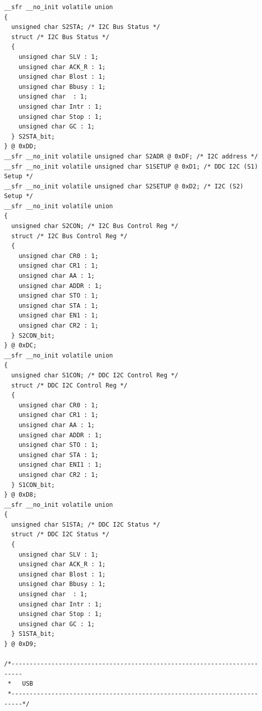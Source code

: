 \documentclass[10pt,a4paper,final]{article}
\begin{document}
\begin{lstlisting}[label={list:first},caption=Code source]
__sfr __no_init volatile union
{
  unsigned char S2STA; /* I2C Bus Status */
  struct /* I2C Bus Status */
  {
    unsigned char SLV : 1;
    unsigned char ACK_R : 1;
    unsigned char Blost : 1;
    unsigned char Bbusy : 1;
    unsigned char  : 1;
    unsigned char Intr : 1;
    unsigned char Stop : 1;
    unsigned char GC : 1;
  } S2STA_bit;
} @ 0xDD;
__sfr __no_init volatile unsigned char S2ADR @ 0xDF; /* I2C address */
__sfr __no_init volatile unsigned char S1SETUP @ 0xD1; /* DDC I2C (S1) Setup */
__sfr __no_init volatile unsigned char S2SETUP @ 0xD2; /* I2C (S2) Setup */
__sfr __no_init volatile union
{
  unsigned char S2CON; /* I2C Bus Control Reg */
  struct /* I2C Bus Control Reg */
  {
    unsigned char CR0 : 1;
    unsigned char CR1 : 1;
    unsigned char AA : 1;
    unsigned char ADDR : 1;
    unsigned char STO : 1;
    unsigned char STA : 1;
    unsigned char EN1 : 1;
    unsigned char CR2 : 1;
  } S2CON_bit;
} @ 0xDC;
__sfr __no_init volatile union
{
  unsigned char S1CON; /* DDC I2C Control Reg */
  struct /* DDC I2C Control Reg */
  {
    unsigned char CR0 : 1;
    unsigned char CR1 : 1;
    unsigned char AA : 1;
    unsigned char ADDR : 1;
    unsigned char STO : 1;
    unsigned char STA : 1;
    unsigned char ENI1 : 1;
    unsigned char CR2 : 1;
  } S1CON_bit;
} @ 0xD8;
__sfr __no_init volatile union
{
  unsigned char S1STA; /* DDC I2C Status */
  struct /* DDC I2C Status */
  {
    unsigned char SLV : 1;
    unsigned char ACK_R : 1;
    unsigned char Blost : 1;
    unsigned char Bbusy : 1;
    unsigned char  : 1;
    unsigned char Intr : 1;
    unsigned char Stop : 1;
    unsigned char GC : 1;
  } S1STA_bit;
} @ 0xD9;

/*-------------------------------------------------------------------------
 *   USB
 *-------------------------------------------------------------------------*/


\end{lstlisting}
\end{document}
